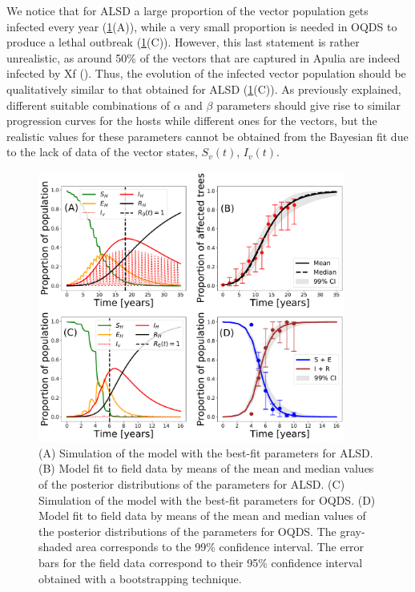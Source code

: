 We notice that for ALSD a large proportion of the vector population gets
infected every year (\cref{fig:best_fit_model}(A)), while a very small
proportion is needed in OQDS to produce a lethal outbreak
(\cref{fig:best_fit_model}(C)). However, this last statement is rather
unrealistic, as around 50\% of the vectors that are captured in Apulia are
indeed infected by Xf (\cite{Cavalieri2019,cornara2017transmission}). Thus, the
evolution of the infected vector population should be qualitatively similar to
that obtained for ALSD (\cref{fig:best_fit_model}(C)). As previously explained,
different suitable combinations of $\alpha$ and $\beta$ parameters should give
rise to similar progression curves for the hosts while different ones for the
vectors, but the realistic values for these parameters cannot be obtained from
the Bayesian fit due to the lack of data of the vector states, $S_v(t)$,
$I_v(t)$.

\begin{figure}[H]
    \centering
    \includegraphics[width=0.9\textwidth]{Figures/BayesianInference.pdf}
    \caption{(A) Simulation of the model with the best-fit parameters for
        ALSD. (B) Model fit to field data by means of the mean and median
        values of the
        posterior distributions of the parameters for ALSD. (C) Simulation of
        the model
        with the best-fit parameters for OQDS. (D) Model fit to field data by
        means of
        the mean and median values of the posterior distributions of the
        parameters for
        OQDS. The gray-shaded area corresponds to the 99\% confidence interval.
        The
        error bars for the field data correspond to their 95\% confidence
        interval
        obtained with a bootstrapping technique.}
    \label{fig:best_fit_model}
\end{figure}

